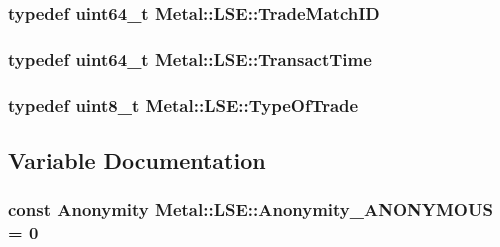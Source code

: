 \subsubsection[{Trade\+Match\+I\+D}]{\setlength{\rightskip}{0pt plus 5cm}typedef uint64\+\_\+t {\bf Metal\+::\+L\+S\+E\+::\+Trade\+Match\+I\+D}}\label{namespaceMetal_1_1LSE_a9026616462e8f8b2d1b41935d63b1f77}
\hypertarget{namespaceMetal_1_1LSE_a4f27043d4f3897c99c960b89b5fe8ddb}{}
\subsubsection[{Transact\+Time}]{\setlength{\rightskip}{0pt plus 5cm}typedef uint64\+\_\+t {\bf Metal\+::\+L\+S\+E\+::\+Transact\+Time}}\label{namespaceMetal_1_1LSE_a4f27043d4f3897c99c960b89b5fe8ddb}
\hypertarget{namespaceMetal_1_1LSE_ae826e079e4b4ee205481709e1436a672}{}
\subsubsection[{Type\+Of\+Trade}]{\setlength{\rightskip}{0pt plus 5cm}typedef uint8\+\_\+t {\bf Metal\+::\+L\+S\+E\+::\+Type\+Of\+Trade}}\label{namespaceMetal_1_1LSE_ae826e079e4b4ee205481709e1436a672}


\subsection{Variable Documentation}
\hypertarget{namespaceMetal_1_1LSE_aa92238612636f2fcb16bc628b9c66697}{}
\subsubsection[{Anonymity\+\_\+\+A\+N\+O\+N\+Y\+M\+O\+U\+S}]{\setlength{\rightskip}{0pt plus 5cm}const {\bf Anonymity} Metal\+::\+L\+S\+E\+::\+Anonymity\+\_\+\+A\+N\+O\+N\+Y\+M\+O\+U\+S = 0}\label{namespaceMetal_1_1LSE_aa92238612636f2fcb16bc628b9c66697}
\hypertarget{namespaceMetal_1_1LSE_a60b500b4d16e49f2824cedd621534d76}{}
